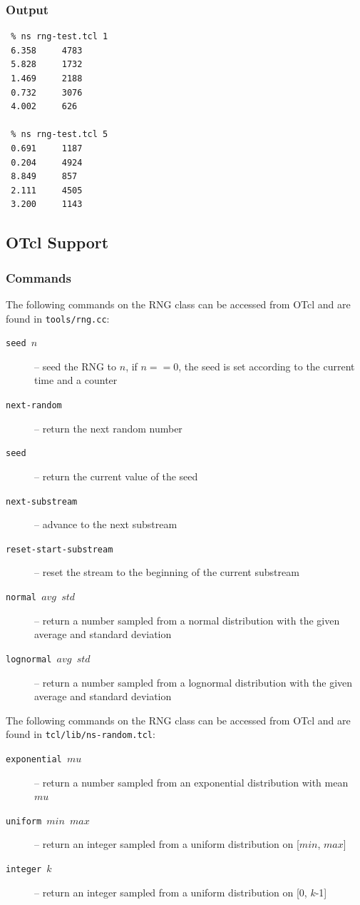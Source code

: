 \subsubsection{Output}

\begin{verbatim}
 % ns rng-test.tcl 1
 6.358     4783
 5.828     1732
 1.469     2188
 0.732     3076
 4.002     626

 % ns rng-test.tcl 5
 0.691     1187
 0.204     4924
 8.849     857
 2.111     4505
 3.200     1143
\end{verbatim}

\subsection{OTcl Support}

\subsubsection{Commands}

The following commands on the RNG class can be accessed from OTcl
and are found in {\tt tools/rng.cc}:
\begin{description}
    \item[{\tt seed $n$}] -- seed the RNG to $n$, if $n == 0$, the seed
    is set according to the current time and a counter
    \item[{\tt next-random}] -- return the next random number
    \item[{\tt seed}] -- return the current value of the seed
    \item[{\tt next-substream}] -- advance to the next substream
    \item[{\tt reset-start-substream}] -- reset the stream to the beginning
    of the current substream
    \item[{\tt normal $avg$ $std$}] -- return a number sampled from a normal
    distribution with the given average and standard deviation
    \item[{\tt lognormal $avg$ $std$}] -- return a number sampled from a
      lognormal distribution with the given average and standard deviation
\end{description}

The following commands on the RNG class can be accessed from OTcl
and are found in {\tt tcl/lib/ns-random.tcl}:
\begin{description}
    \item[{\tt exponential $mu$}] -- return a number sampled from an
      exponential distribution with mean $mu$ 
    \item[{\tt uniform $min$ $max$}] -- return an integer sampled from a
    uniform distribution on [$min$, $max$]
    \item[{\tt integer $k$}] -- return an integer sampled from a uniform
    distribution on [0, $k$-1]
\end{description}

